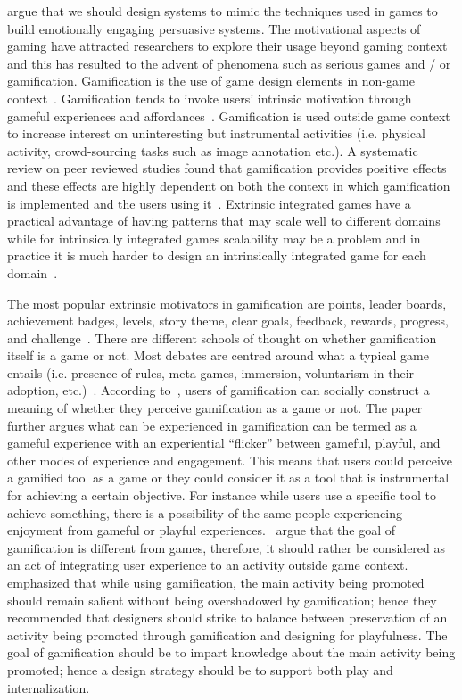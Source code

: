 \cite{nakajima2013designing} argue that we should design systems to mimic the techniques used in games to build emotionally engaging persuasive systems. The motivational aspects of gaming have attracted researchers to explore their usage beyond gaming context and this has resulted to the advent of phenomena such as serious games and / or gamification. Gamification is the use of game design elements in non-game context~\citep{deterding2011game}. Gamification tends to invoke users’ intrinsic motivation through gameful experiences and affordances~\citep{hamari2014persuasive}. Gamification is used outside game context to increase interest on uninteresting but instrumental activities (i.e. physical activity, crowd-sourcing tasks such as image annotation etc.). A systematic review on peer reviewed studies found that gamification provides positive effects and these effects are highly dependent on both the context in which gamification is implemented and the users using it~\citep{hamari2014does}. Extrinsic integrated games have a practical advantage of having patterns that may scale well to different domains while for intrinsically integrated games scalability may be a problem and in practice it is much harder to design an intrinsically integrated game for each domain~\citep{preist2015use}.

The most popular extrinsic motivators in gamification are points, leader boards, achievement badges, levels, story theme, clear goals, feedback, rewards, progress, and challenge~\citep{hamari2014does}. There are different schools of thought on whether gamification itself is a game or not. Most debates are centred around what a typical game entails (i.e. presence of rules, meta-games, immersion, voluntarism in their adoption, etc.)~\citep{seaborn2015:gamification}. According to~\cite{deterding2011game}, users of gamification can socially construct a meaning of whether they perceive gamification as a game or not. The paper further argues what can be experienced in gamification can be termed as a gameful experience with an experiential ``flicker'' between gameful, playful, and other modes of experience and engagement. This means that users could perceive a gamified tool as a game or they could consider it as a tool that is instrumental for achieving a certain objective. For instance while users use a specific tool to achieve something, there is a possibility of the same people experiencing enjoyment from gameful or playful experiences.~\cite{seaborn2015:gamification} argue that the goal of gamification is different from games, therefore, it should rather be considered as an act of integrating user experience to an activity outside game context.~\cite{knaving2013designing} emphasized that while using gamification, the main activity being promoted should remain salient without being overshadowed by gamification; hence they recommended that designers should strike to balance between preservation of an activity being promoted through gamification and designing for playfulness. The goal of gamification should be to impart knowledge about the main activity being promoted; hence a design strategy should be to support both play and internalization.

